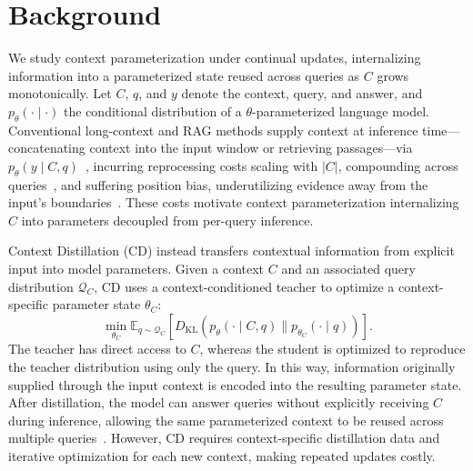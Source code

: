\section{Background}
\label{sec:background}

We study context parameterization under continual updates, internalizing information into a parameterized state reused across queries as $C$ grows monotonically.
Let $C$, $q$, and $y$ denote the context, query, and answer, and $p_\theta(\cdot\mid\cdot)$ the conditional distribution of a $\theta$-parameterized language model.
Conventional long-context and RAG methods supply context at inference time---concatenating context into the input window or retrieving passages---via $p_\theta(y\mid C,q)$~\citep{lewis2020retrieval,guu2020retrieval,ding2023longnet}, incurring reprocessing costs scaling with $|C|$, compounding across queries~\citep{gao2023retrieval}, and suffering position bias, underutilizing evidence away from the input's boundaries~\citep{liu2024lost,hsieh2024found}.
These costs motivate context parameterization internalizing $C$ into parameters decoupled from per-query inference.

Context Distillation (CD) instead transfers contextual information from explicit input into model parameters.
Given a context $C$ and an associated query distribution $\mathcal{Q}_C$, CD uses a context-conditioned teacher to optimize a context-specific parameter state $\theta_C$:
\begin{equation}
\min_{\theta_C}\mathbb{E}_{q\sim\mathcal{Q}_C}\left[
D_{\mathrm{KL}}\left(p_\theta(\cdot\mid C,q)\parallel
p_{\theta_C}(\cdot\mid q)\right)\right].
\end{equation}
The teacher has direct access to $C$, whereas the student is optimized to reproduce the teacher distribution using only the query.
In this way, information originally supplied through the input context is encoded into the resulting parameter state.
After distillation, the model can answer queries without explicitly receiving $C$ during inference, allowing the same parameterized context to be reused across multiple queries~\citep{askell2021general,snell2022learning}.
However, CD requires context-specific distillation data and iterative optimization for each new context, making repeated updates costly.

